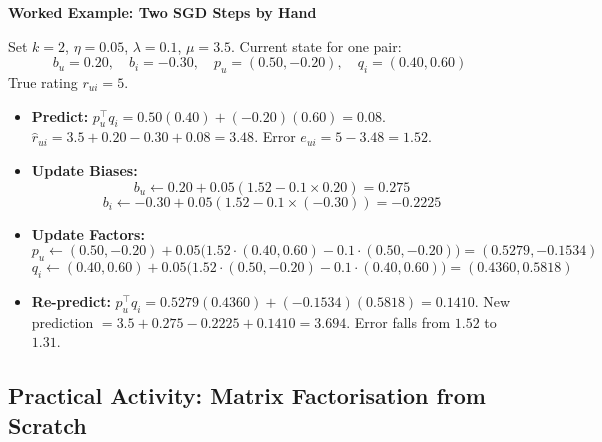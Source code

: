 \documentclass[12pt,a4paper]{article}
\begin{document}
\begin{example}
\textbf{Worked Example: Two SGD Steps by Hand}

Set $k=2$, $\eta = 0.05$, $\lambda = 0.1$, $\mu = 3.5$. Current state for one pair:
\[
b_u = 0.20, \quad b_i = -0.30, \quad p_u = (0.50, -0.20), \quad q_i = (0.40, 0.60)
\]
True rating $r_{ui} = 5$.

\begin{itemize}
    \item \textbf{Predict:} $p_u^{\top} q_i = 0.50(0.40) + (-0.20)(0.60) = 0.08$. $\hat{r}_{ui} = 3.5 + 0.20 - 0.30 + 0.08 = 3.48$. Error $e_{ui} = 5 - 3.48 = 1.52$.
    \item \textbf{Update Biases:}
    \[ b_u \leftarrow 0.20 + 0.05(1.52 - 0.1 \times 0.20) = 0.275 \]
    \[ b_i \leftarrow -0.30 + 0.05(1.52 - 0.1 \times (-0.30)) = -0.2225 \]
    \item \textbf{Update Factors:}
    \[ p_u \leftarrow (0.50, -0.20) + 0.05\big(1.52 \cdot (0.40, 0.60) - 0.1 \cdot (0.50, -0.20)\big) = (0.5279, -0.1534) \]
    \[ q_i \leftarrow (0.40, 0.60) + 0.05\big(1.52 \cdot (0.50, -0.20) - 0.1 \cdot (0.40, 0.60)\big) = (0.4360, 0.5818) \]
    \item \textbf{Re-predict:} $p_u^{\top} q_i = 0.5279(0.4360) + (-0.1534)(0.5818) = 0.1410$. New prediction $= 3.5 + 0.275 - 0.2225 + 0.1410 = 3.694$. Error falls from $1.52$ to $1.31$.
\end{itemize}
\end{example}

\subsection{Practical Activity: Matrix Factorisation from Scratch}
\end{document}
